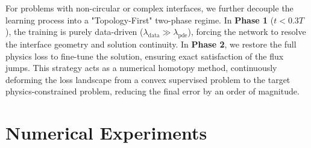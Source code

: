\documentclass[11pt]{article}
\theoremstyle{definition}
\theoremstyle{remark}
\theoremstyle{plain}
\begin{document}
For problems with non-circular or complex interfaces, we further decouple the learning process into a "Topology-First" two-phase regime. In \textbf{Phase 1} ($t < 0.3T$), the training is purely data-driven ($\lambda_{\text{data}} \gg \lambda_{\text{pde}}$), forcing the network to resolve the interface geometry and solution continuity. In \textbf{Phase 2}, we restore the full physics loss to fine-tune the solution, ensuring exact satisfaction of the flux jumps. This strategy acts as a numerical homotopy method, continuously deforming the loss landscape from a convex supervised problem to the target physics-constrained problem, reducing the final error by an order of magnitude.

\section{Numerical Experiments}
\label{sec:experiments}



\end{document}
